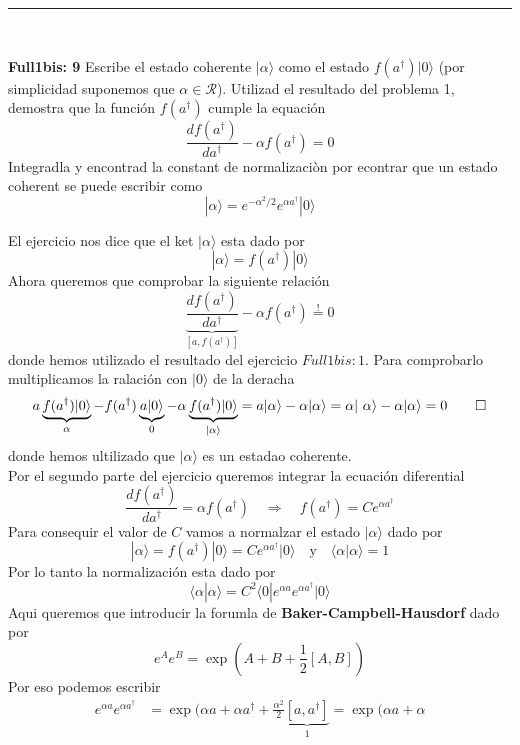 \noindent\rule{\textwidth}{1px}\\

\begin{ejercicio}
\textbf{Full1bis: 9}
	Escribe el estado coherente $|\alpha\rangle$ como el estado
$f(a^\dagger)|0\rangle$ (por simplicidad suponemos que $\alpha \in
\mathcal{R}$). Utilizad el resultado del problema 1, demostra que la función
$f(a^\dagger)$ cumple la equación
$$
	\frac{d f(a^\dagger)}{d a^\dagger} - \alpha f(a^\dagger) = 0
$$
Integradla y encontrad la constant de normalizaciòn por econtrar que un estado
coherent se puede escribir como
$$
	|\alpha \rangle = e^{-\alpha^2/2} e^{\alpha a^\dagger} | 0\rangle
$$
\end{ejercicio}
\begin{solucion}
El ejercicio nos dice que el ket $|\alpha\rangle$ esta dado por
$$
	|\alpha\rangle = f(a^\dagger)|0\rangle
$$
Ahora queremos que comprobar la siguiente relación
$$
	\underbrace{\frac{d f(a^\dagger)}{d a^\dagger}}_{[a, f(a^\dagger)]} - \alpha f(a^\dagger) \overset{!}{=} 0
$$
donde hemos utilizado el resultado del ejercicio $Full1bis: 1$. Para comprobarlo
multiplicamos la ralación con $|0\rangle$ de la deracha
$$
	a \underbrace{f(a^\dagger)|0\rangle}_{\alpha} - f(a^\dagger)
\underbrace{a|0\rangle}_{0} -\alpha
\underbrace{f(a^\dagger)|0\rangle}_{|\alpha\rangle} = a | \alpha \rangle -
\alpha | \alpha \rangle = \alpha | \alpha \rangle - \alpha | \alpha \rangle = 0
\qed
$$
donde hemos ultilizado que $|\alpha\rangle$ es un estadao coherente. \\
Por el segundo parte del ejercicio queremos integrar la ecuación diferential 
$$
	\frac{d f(a^\dagger)}{d a^\dagger} = \alpha f(a^\dagger) \quad \Rightarrow
\quad f(a^\dagger) = C e^{\alpha a^\dagger}
$$
Para consequir el valor de $C$ vamos a normalzar el estado $|\alpha\rangle$ dado
por
$$
	|\alpha\rangle = f(a^\dagger) | 0\rangle = C e^{\alpha a^\dagger} | 0
\rangle \quad \text{y} \quad \langle \alpha | \alpha \rangle = 1
$$
Por lo tanto la normalización esta dado por
$$
	\langle \alpha | \alpha \rangle = C^2 \langle 0 | e^{\alpha a} e^{\alpha
a^\dagger} | 0\rangle
$$
Aqui queremos que introducir la forumla de \textbf{Baker-Campbell-Hausdorf} dado
por
$$
	e^A e^B = \exp(A+B+\frac{1}{2}[A,B])
$$
Por eso podemos escribir
\begin{align*}
	e^{\alpha a} e^{\alpha a^\dagger} &= \exp(\alpha a + \alpha a^\dagger +
\frac{\alpha^2}{2} \underbrace{[a, a^\dagger]}_1 = \exp(\alpha a + \alpha

\end{align*}
\end{solucion}
